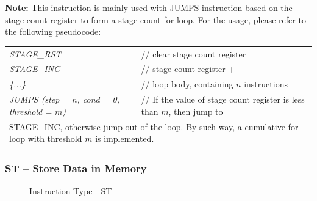 \documentclass[main\_\_EN.tex]{subfiles}
\begin{document}
\textbf{Note:}
    This instruction is mainly used with JUMPS instruction based on the stage count register to form a stage count for-loop.
    For the usage, please refer to the following pseudocode:

\begin{table}[!ht ]
    \centering
    \begin{tabular}{ l l }
    \textit{STAGE\_RST}  & // clear stage count register   \\
    \textit{STAGE\_INC} & // stage count register ++  \\
    \textit{\{...\}} &  // loop body, containing  \begin{math}n\end{math} instructions   \\
    \textit{JUMPS (step = \begin{math}n\end{math}, cond = 0, threshold = \begin{math}m\end{math})}  & // If the value of stage count register is less than \begin{math}m\end{math}, then jump to \\
    \multicolumn{2}{l}{STAGE\_INC, otherwise jump out of the loop. By such way, a cumulative for-loop with threshold \begin{math}m\end{math} is implemented.}
    \end{tabular}
\end{table}


\subsubsection{ST – Store Data in Memory}\label{st instruction}


%
%
%
%
%
%
%
%
%
%
%
%
\begin{figure}[!ht ]
    \centering
    \caption{Instruction Type - ST}
    \label{figure:ST}
\end{figure}
\end{document}
